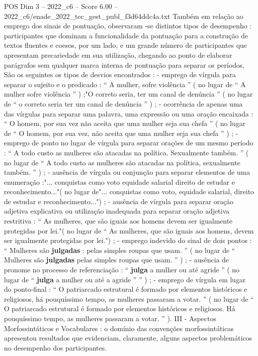 \begin{textsample}{POS Dim 3 – 2022\_c6 – Score 6.00 – 2022\_c6/enade\_2022\_tec\_gest\_publ\_f3d64ddc4a.txt}
Também em relação ao emprego dos sinais de pontuação, observaram -se distintos tipos de desempenho : participantes que dominam a funcionalidade da pontuação para a construção de textos fluentes e coesos, por um lado, e um grande número de participantes que apresentam precariedade em sua utilização, chegando ao ponto de elaborar parágrafos sem qualquer marca interna de pontuação para separar os períodos.
São os seguintes os tipos de desvios encontrados : - emprego de vírgula para separar o sujeito e o predicado : “ A mulher, sofre violência ” ( no lugar de “ A mulher sofre violência ” ) ;"O correto seria, ter um canal de denúncia ” ( no lugar de “ o correto seria ter um canal de denúncia ” ) ; - ocorrência de apenas uma das vírgulas para separar uma palavra, uma expressão ou uma oração encaixada : “ O homem, por sua vez não aceita que uma mulher seja sua chefa ” ( no lugar de “ O homem, por sua vez, não aceita que uma mulher seja sua chefa ” ) ; - emprego de ponto no lugar de vírgula para separar orações de um mesmo período : “ A todo custo as mulheres são atacadas na política.
Sexualmente também. ” ( no lugar de “ A todo custo as mulheres são atacadas na política, sexualmente também. ” ) ; - ausência de vírgula ou conjunção para separar elementos de uma enumeração :"... conquistas como voto equidade salarial direito de estudar e reconhecimento..."( no lugar de"... conquistas como voto, equidade salarial, direito de estudar e reconhecimento...") ; - ausência de vírgula para separar oração adjetiva explicativa ou utilização inadequada para separar oração adjetiva restritiva : “ As mulheres, que são iguais aos homens devem ser igualmente protegidas por lei."( no lugar de “ As mulheres, que são iguais aos homens, devem ser igualmente protegidas por lei.") ; - emprego indevido do sinal de dois pontos : “ Mulheres são \textbf{julgadas} : pelas simples roupas que usam. ” ( no lugar de “ Mulheres são \textbf{julgadas} pelas simples roupas que usam. ” ) ; - ausência de pronome no processo de referenciação : “ \textbf{julga} a mulher ou até agride ” ( no lugar de “ \textbf{julga} a mulher ou até a agride ” ” ) ; - emprego de vírgula em lugar do ponto-final : “ O patriarcado estrutural é formado por elementos históricos e religiosos, há pouquíssimo tempo, as mulheres passaram a votar. ” ( no lugar de “ O patriarcado estrutural é formado por elementos históricos e religiosos.
Há pouquíssimo tempo, as mulheres passaram a votar. ” ).
III - Aspectos Morfossintáticos e Vocabulares : o domínio das convenções morfossintáticas apresentou resultados que evidenciam, claramente, alguns aspectos problemáticos no desempenho dos participantes.

\end{textsample}
